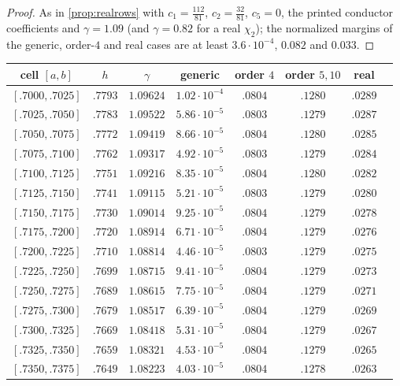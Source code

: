 \documentclass[11pt]{amsart}
\numberwithin{equation}{section}
\theoremstyle{plain}
\theoremstyle{definition}
\theoremstyle{remark}
\newcommand{\1}{\mathbf{1}}
\begin{document}
\begin{proof}
As in \cref{prop:realrows} with $c_1=\frac{112}{81}$, $c_2=\frac{32}{81}$, $c_5=0$, the printed conductor
coefficients and $\gamma=1.09$ (and $\gamma=0.82$ for a real $\chi_2$); the normalized margins of the
generic, order-$4$ and real cases are at least $3.6\cdot10^{-4}$, $0.082$ and $0.033$.
\end{proof}

\begin{table}[ht]
\centering
\scriptsize
\begin{tabular}{@{}cccccccc@{}}
\toprule
cell $[a,b]$ & $h$ & $\gamma$ & generic & order $4$ & order $5,10$ & real & \\
\midrule
$[.7000,.7025]$ & $.7793$ & $1.09624$ & $1.02\cdot10^{-4}$ & $.0804$ & $.1280$ & $.0289$\\
$[.7025,.7050]$ & $.7783$ & $1.09522$ & $5.86\cdot10^{-5}$ & $.0803$ & $.1279$ & $.0287$\\
$[.7050,.7075]$ & $.7772$ & $1.09419$ & $8.66\cdot10^{-5}$ & $.0804$ & $.1280$ & $.0285$\\
$[.7075,.7100]$ & $.7762$ & $1.09317$ & $4.92\cdot10^{-5}$ & $.0803$ & $.1279$ & $.0284$\\
$[.7100,.7125]$ & $.7751$ & $1.09216$ & $8.35\cdot10^{-5}$ & $.0804$ & $.1280$ & $.0282$\\
$[.7125,.7150]$ & $.7741$ & $1.09115$ & $5.21\cdot10^{-5}$ & $.0803$ & $.1279$ & $.0280$\\
$[.7150,.7175]$ & $.7730$ & $1.09014$ & $9.25\cdot10^{-5}$ & $.0804$ & $.1279$ & $.0278$\\
$[.7175,.7200]$ & $.7720$ & $1.08914$ & $6.71\cdot10^{-5}$ & $.0804$ & $.1279$ & $.0276$\\
$[.7200,.7225]$ & $.7710$ & $1.08814$ & $4.46\cdot10^{-5}$ & $.0803$ & $.1279$ & $.0275$\\
$[.7225,.7250]$ & $.7699$ & $1.08715$ & $9.41\cdot10^{-5}$ & $.0804$ & $.1279$ & $.0273$\\
$[.7250,.7275]$ & $.7689$ & $1.08615$ & $7.75\cdot10^{-5}$ & $.0804$ & $.1279$ & $.0271$\\
$[.7275,.7300]$ & $.7679$ & $1.08517$ & $6.39\cdot10^{-5}$ & $.0804$ & $.1279$ & $.0269$\\
$[.7300,.7325]$ & $.7669$ & $1.08418$ & $5.31\cdot10^{-5}$ & $.0804$ & $.1279$ & $.0267$\\
$[.7325,.7350]$ & $.7659$ & $1.08321$ & $4.53\cdot10^{-5}$ & $.0804$ & $.1279$ & $.0265$\\
$[.7350,.7375]$ & $.7649$ & $1.08223$ & $4.03\cdot10^{-5}$ & $.0804$ & $.1278$ & $.0263$\\

\end{tabular}
\end{table}
\end{document}
